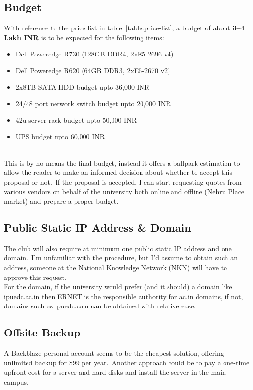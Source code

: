 \subsection{Budget}\label{subsec:budget}
With reference to the price list in table~\ref{table:price-list}, a budget of about \textbf{\large3--4 Lakh INR} is
to be expected for the following items:
\begin{itemize}
    \item Dell Poweredge R730 (128GB DDR4, 2xE5-2696 v4)
    \item Dell Poweredge R620 (64GB DDR3, 2xE5-2670 v2)
    \item 2x8TB SATA HDD budget upto 36,000 INR
    \item 24/48 port network switch budget upto 20,000 INR
    \item 42u server rack budget upto 50,000 INR
    \item UPS budget upto 60,000 INR
\end{itemize}
\\
This is by no means the final budget, instead it offers a ballpark estimation to allow the reader to make an informed
decision about whether to accept this proposal or not.\ If the proposal is accepted, I can start requesting quotes
from various vendors on behalf of the university both online and offline (Nehru Place market) and prepare a proper
budget.


\subsection{Public Static IP Address \& Domain}\label{subsec:domain-registration}
The club will also require at minimum one public static IP address and one domain.\ I'm unfamiliar with the procedure,
but I'd assume to obtain such an address, someone at the National Knowledge Network (NKN) will have to approve this
request.\\
For the domain, if the university would prefer (and it should) a domain like \url{ipuedc.ac.in} then ERNET is the
responsible authority for \url{ac.in} domains, if not, domains such as \url{ipuedc.com} can be obtained with relative
ease.


\subsection{Offsite Backup}\label{subsec:offsite-backup}
A Backblaze personal account seems to be the cheapest solution, offering unlimited backup for \$99 per year.\ Another
approach could be to pay a one-time upfront cost for a server and hard disks and install the server in the main campus.

